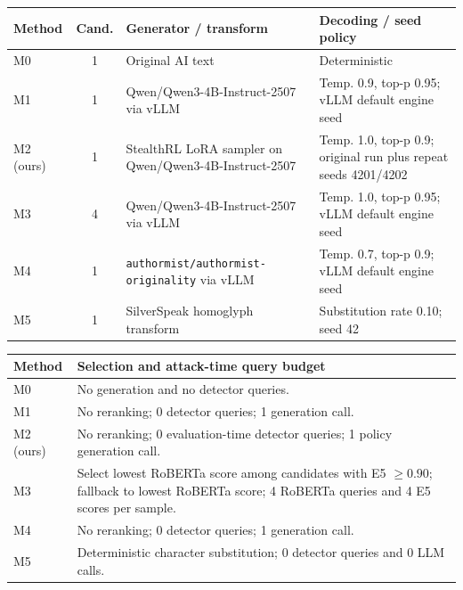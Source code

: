 \documentclass[11pt]{article}
\begin{document}
\begin{center}
\scriptsize
\setlength{\tabcolsep}{2pt}
\begin{tabularx}{\columnwidth}{l c >{\raggedright\arraybackslash}X >{\raggedright\arraybackslash}X}
\toprule
\textbf{Method} & \textbf{Cand.} & \textbf{Generator / transform} & \textbf{Decoding / seed policy} \\
\midrule
M0 & 1 & Original AI text & Deterministic \\
M1 & 1 & Qwen/\allowbreak Qwen3-4B-Instruct-2507 via vLLM & Temp. 0.9, top-p 0.95; vLLM default engine seed \\
M2 (ours) & 1 & StealthRL LoRA sampler on Qwen/\allowbreak Qwen3-4B-Instruct-2507 & Temp. 1.0, top-p 0.9; original run plus repeat seeds 4201/4202 \\
M3 & 4 & Qwen/\allowbreak Qwen3-4B-Instruct-2507 via vLLM & Temp. 1.0, top-p 0.95; vLLM default engine seed \\
M4 & 1 & \texttt{authormist/}\allowbreak\texttt{authormist-originality} via vLLM & Temp. 0.7, top-p 0.9; vLLM default engine seed \\
M5 & 1 & SilverSpeak homoglyph transform & Substitution rate 0.10; seed 42 \\
\bottomrule
\end{tabularx}
\label{tab:attack_protocol}
\end{center}

\begin{center}
\scriptsize
\setlength{\tabcolsep}{3pt}
\begin{tabularx}{\columnwidth}{l >{\raggedright\arraybackslash}X}
\toprule
\textbf{Method} & \textbf{Selection and attack-time query budget} \\
\midrule
M0 & No generation and no detector queries. \\
M1 & No reranking; 0 detector queries; 1 generation call. \\
M2 (ours) & No reranking; 0 evaluation-time detector queries; 1 policy generation call. \\
M3 & Select lowest RoBERTa score among candidates with E5 $\geq 0.90$; fallback to lowest RoBERTa score; 4 RoBERTa queries and 4 E5 scores per sample. \\
M4 & No reranking; 0 detector queries; 1 generation call. \\
M5 & Deterministic character substitution; 0 detector queries and 0 LLM calls. \\
\bottomrule
\end{tabularx}
\label{tab:attack_protocol_queries}
\end{center}
\end{document}
